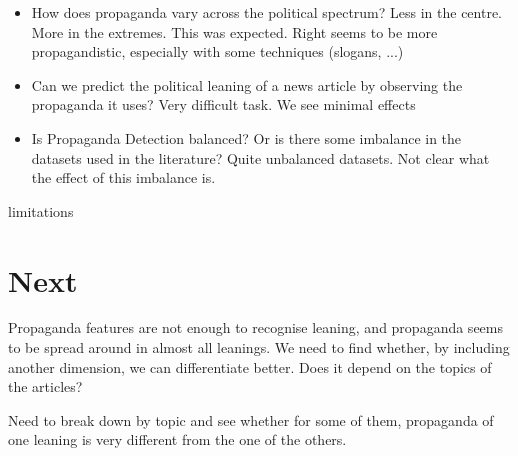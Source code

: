 \begin{itemize}
    \item How does propaganda vary across the political spectrum? Less in the centre. More in the extremes. This was expected. Right seems to be more propagandistic, especially with some techniques (slogans, ...)
    \item Can we predict the political leaning of a news article by observing the propaganda it uses? Very difficult task. We see minimal effects
    \item Is Propaganda Detection balanced? Or is there some imbalance in the datasets used in the literature? Quite unbalanced datasets. Not clear what the effect of this imbalance is.
\end{itemize}

limitations

\section{Next}
\label{sec:ps_next}

Propaganda features are not enough to recognise leaning, and propaganda seems to be spread around in almost all leanings. We need to find whether, by including another dimension, we can differentiate better. 
Does it depend on the topics of the articles?

Need to break down by topic and see whether for some of them, propaganda of one leaning is very different from the one of the others.